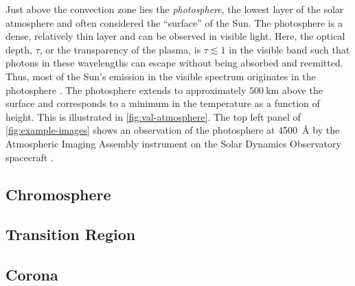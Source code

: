 Just above the convection zone lies the \textit{photosphere}, the lowest layer of the solar atmosphere and often considered the ``surface'' of the Sun. The photosphere is a dense, relatively thin layer and can be observed in visible light. Here, the optical depth, $\tau$, or the transparency of the plasma, is $\tau\lesssim1$ in the visible band such that photons in these wavelengths can escape without being absorbed and reemitted. Thus, most of the Sun's emission in the visible spectrum originates in the photosphere \citep{priest_magnetohydrodynamics_2014}. The photosphere extends to approximately $\SI{500}{\km}$ above the surface and corresponds to a minimum in the temperature as a function of height. This is illustrated in \autoref{fig:val-atmosphere}. The top left panel of \autoref{fig:example-images} shows an observation of the photosphere at \SI{4500}{\angstrom} by the Atmospheric Imaging Assembly instrument \citep[AIA][]{lemen_atmospheric_2012} on the Solar Dynamics Observatory spacecraft \citep[SDO][]{pesnell_solar_2012}.

\subsection{Chromosphere}\label{sec:chromosphere}


\subsection{Transition Region}\label{sec:transition_region}

%

\subsection{Corona}\label{sec:corona}


